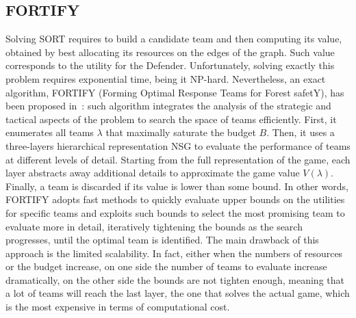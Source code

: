 \subsection{FORTIFY}
Solving SORT requires to build a candidate team and then computing its value, obtained by best allocating its resources on the edges of the graph. Such value corresponds to the utility for the Defender. Unfortunately, solving exactly this problem requires exponential time, being it \textsf{NP}-hard. Nevertheless, an exact algorithm, FORTIFY (Forming Optimal Response Teams for Forest safetY), has been proposed in~\cite{mc2016preventing}: such algorithm integrates the analysis of the strategic and tactical aspects of the problem to search the space of teams efficiently. First, it enumerates all teams $\lambda$ that maximally saturate the budget $B$. Then, it uses a three-layers hierarchical representation NSG to evaluate the performance of teams at different levels of detail. Starting from the full representation of the game, each layer abstracts away additional details to approximate the game value $V(\lambda)$. Finally, a team is discarded if its value is lower than some bound. In other words, FORTIFY adopts fast methods to quickly evaluate upper bounds on the utilities for specific teams and exploits such bounds to select the most promising team to evaluate more in detail, iteratively tightening the bounds as the search progresses, until the optimal team is identified. The main drawback of this approach is the limited scalability. In fact, either when the numbers of resources or the budget increase, on one side the number of teams to evaluate increase dramatically, on the other side the bounds are not tighten enough, meaning that a lot of teams will reach the last layer, the one that solves the actual game, which is the most expensive in terms of computational cost.